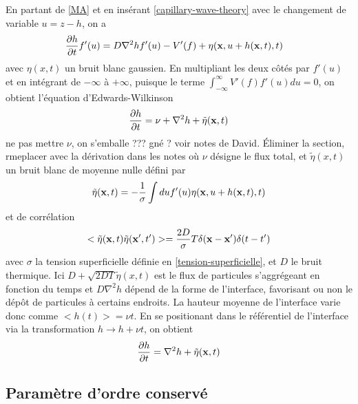 En partant de \ref{MA} et en insérant \ref{capillary-wave-theory} avec le changement de variable $u= z-h$, on a \cite{bray_interface_2001}
\begin{align}
    \frac{\partial h}{\partial t} f'(u) &= D \nabla^2 h f'(u) - V'(f) + \eta({\bf x},u+h({\bf x},t),t)
\end{align}
avec $\eta(x,t)$ un bruit blanc gaussien. En multipliant les deux côtés par $f'(u)$ et en intégrant de $-\infty$ à $+\infty$, puisque le terme $ \int_{-\infty}^\infty V'(f) f'(u) du = 0$, on obtient l'équation d'Edwards-Wilkinson \cite{edwards_surface_1982} 
\begin{align}
     \frac{\partial h}{\partial t} = \nu + \nabla^2 h +  \tilde{\eta}({\bf x},t)
    \label{edwards-wilkinson}
\end{align}
{\color{red} ne pas mettre $\nu$, on s'emballe ??? gné ? voir notes de David. Éliminer la section, rmeplacer avec la dérivation dans les notes}
où $\nu$ désigne le flux total, et $\tilde{\eta}(x,t)$  un bruit blanc de moyenne nulle défini par
\begin{align}
    \tilde{\eta}({\bf x},t) = - \frac{1}{\sigma} \int du f'(u) \eta({\bf x},u+h({\bf x},t),t)
\end{align}
et de corrélation 
\begin{align}
    <\tilde{\eta}({\bf x},t)\tilde{\eta}({\bf x}',t')> = \frac{2 D}{\sigma} T\delta({\bf x}-{\bf x}')\delta(t-t')
\end{align}
avec $\sigma$ la tension superficielle définie en \ref{tension-superficielle}, et $D$ le bruit thermique.
Ici $D+ \sqrt{2 D T} \tilde{\eta}(x,t)$ est le flux de particules s'aggrégeant en fonction du temps et $D \nabla^2 h$ dépend de la forme de l'interface, favorisant ou non le dépôt de particules à certains endroits.
La hauteur moyenne de l'interface varie donc comme $<h(t)> = \nu t$. En se positionant dans le référentiel de l'interface via la transformation $h \rightarrow h + \nu t$, on obtient
\begin{align}
     \frac{\partial h}{\partial t} =    \nabla^2 h +  \tilde{\eta}({\bf x},t)
    \label{edwards-wilkinson-conesrved}
\end{align}

    \subsection{Paramètre d'ordre conservé}

